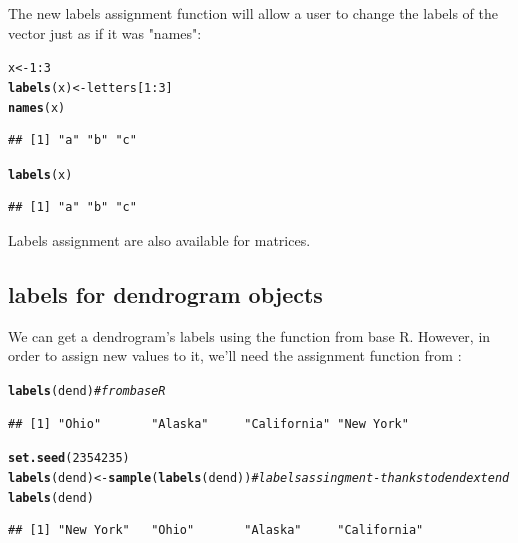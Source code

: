 \documentclass[shortnames,nojss,article]{jss}\usepackage[]{graphicx}\usepackage[]{color}
\makeatletter
\newcommand{\hlnum}[1]{\textcolor[rgb]{0.686,0.059,0.569}{#1}}%
\newcommand{\hlcom}[1]{\textcolor[rgb]{0.678,0.584,0.686}{\textit{#1}}}%
\newcommand{\hlopt}[1]{\textcolor[rgb]{0,0,0}{#1}}%
\newcommand{\hlstd}[1]{\textcolor[rgb]{0.345,0.345,0.345}{#1}}%
\newcommand{\hlkwb}[1]{\textcolor[rgb]{0.69,0.353,0.396}{#1}}%
\newcommand{\hlkwd}[1]{\textcolor[rgb]{0.737,0.353,0.396}{\textbf{#1}}}%
\newenvironment{kframe}{%
 \def\at@end@of@kframe{}%
 \ifinner\ifhmode%
  \def\at@end@of@kframe{\end{minipage}}%
  \begin{minipage}{\columnwidth}%
 \fi\fi%
 \def\FrameCommand##1{\hskip\@totalleftmargin \hskip-\fboxsep
 \colorbox{shadecolor}{##1}\hskip-\fboxsep
     \hskip-\linewidth \hskip-\@totalleftmargin \hskip\columnwidth}%
 \MakeFramed {\advance\hsize-\width
   \@totalleftmargin\z@ \linewidth\hsize
   \@setminipage}}%
 {\par\unskip\endMakeFramed%
 \at@end@of@kframe}
\newenvironment{knitrout}{}{} %
\makeatother
\begin{document}
The new labels assignment function will allow a user to change the labels of the vector just as if it was "names":

\begin{knitrout}
\color{fgcolor}\begin{kframe}
\begin{alltt}
\hlstd{x} \hlkwb{<-} \hlnum{1}\hlopt{:}\hlnum{3}
\hlkwd{labels}\hlstd{(x)} \hlkwb{<-} \hlstd{letters[}\hlnum{1}\hlopt{:}\hlnum{3}\hlstd{]}
\hlkwd{names}\hlstd{(x)}
\end{alltt}
\begin{verbatim}
## [1] "a" "b" "c"
\end{verbatim}
\begin{alltt}
\hlkwd{labels}\hlstd{(x)}
\end{alltt}
\begin{verbatim}
## [1] "a" "b" "c"
\end{verbatim}
\end{kframe}
\end{knitrout}


Labels assignment are also available for matrices.


\subsection{labels for dendrogram objects}

We can get a dendrogram's labels using the  function from base R. However, in order to assign new values to it, we'll need the assignment function from :

\begin{knitrout}
\color{fgcolor}\begin{kframe}
\begin{alltt}
\hlkwd{labels}\hlstd{(dend)}  \hlcom{# from base R}
\end{alltt}
\begin{verbatim}
## [1] "Ohio"       "Alaska"     "California" "New York"
\end{verbatim}
\begin{alltt}
\hlkwd{set.seed}\hlstd{(}\hlnum{2354235}\hlstd{)}
\hlkwd{labels}\hlstd{(dend)} \hlkwb{<-} \hlkwd{sample}\hlstd{(}\hlkwd{labels}\hlstd{(dend))}  \hlcom{# labels assingment - thanks to dendextend}
\hlkwd{labels}\hlstd{(dend)}
\end{alltt}
\begin{verbatim}
## [1] "New York"   "Ohio"       "Alaska"     "California"
\end{verbatim}
\end{kframe}
\end{knitrout}
\end{document}
